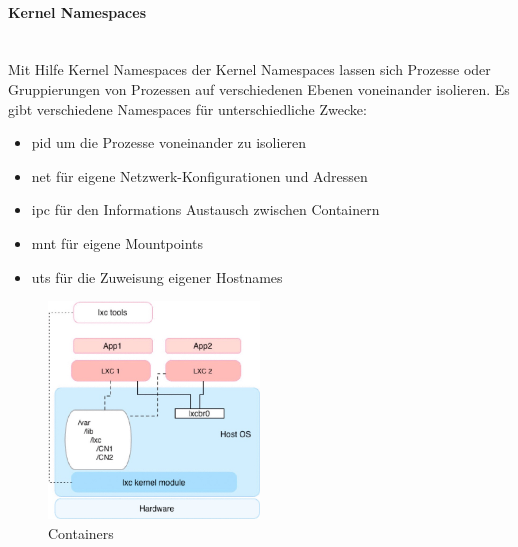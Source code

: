 \paragraph{Kernel Namespaces } \mbox{} \\
\noindent Mit Hilfe Kernel Namespaces der Kernel Namespaces lassen sich Prozesse oder Gruppierungen von Prozessen auf verschiedenen Ebenen voneinander isolieren. Es gibt verschiedene Namespaces für unterschiedliche Zwecke:
\begin{itemize}
  \item pid um die Prozesse voneinander zu isolieren \cite{lnpid}
  \item net für eigene Netzwerk-Konfigurationen und Adressen \cite{lnnet}
  \item ipc für den Informations Austausch zwischen Containern \cite{lnipc}
  \item mnt für eigene Mountpoints \cite{lnns}
  \item uts für die Zuweisung eigener Hostnames \cite{lnuts}
\end{itemize}

\begin{figure}[!ht]
  \centering
  \includegraphics[width=0.5\textwidth]{images/3-containers.jpg}
  \caption{Containers \cite{6903537}}
\end{figure}

